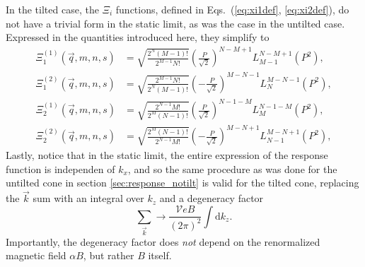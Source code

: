 In the tilted case, the \( \Xi_{i} \) functions, defined in Eqs.~(\ref{eq:xi1def}, \ref{eq:xi2def}), do not have a trivial form in the static limit, as was the case in the untilted case.
Expressed in the quantities introduced here, they simplify to
\begin{subequations}
  \begin{align}
    \Xi_1 ^{(1)}(\vec{q}, m, n, s) &= \sqrt{\frac{2^N (M-1)!}{2^{M-1} N!}}
                                     \left( \frac{P}{\sqrt{2}} \right)^{N-M + 1}
                                     L^{N-M+1}_{M-1} \left( P^2 \right),\\
    \Xi_1 ^{(2)}(\vec{q}, m, n, s) &= \sqrt{\frac{2^{M-1} N!}{2^N (M-1)!}}
                                     \left( -\frac{P}{\sqrt{2}} \right)^{M-N - 1}
                                     L^{M - N - 1}_N \left( P^2 \right),
  \end{align}
\end{subequations}
\begin{subequations}
  \begin{align}
    \Xi_2 ^{(1)}(\vec{q}, m, n, s) &= \sqrt{\frac{2^{N-1} M!}{2^M (N-1)!}}
                                     \left( \frac{P}{\sqrt{2}} \right)^{N-1 - M}
                                     L^{N-1 -M}_{M} \left( P^2 \right),\\
    \Xi_2 ^{(2)}(\vec{q}, m, n, s) &= \sqrt{\frac{2^M (N-1)!}{2^{N-1} M!}}
                                     \left( -\frac{P}{\sqrt{2}} \right)^{M-N + 1}
                                     L^{M - N + 1}_{N-1} \left( P^2 \right),
  \end{align}
\end{subequations}
Lastly, notice that in the static limit, the entire expression of the response function is independen of \( k_x \), and so the same procedure as was done for the untilted cone in section \ref{sec:response_notilt} is valid for the tilted cone, replacing the \( \vec{k} \) sum with an integral over \( k_z \) and a degeneracy factor
\begin{equation}
  \label{eq:113}
  \sum\limits_{\vec{k}}^{} \to \frac{\mathcal{V} e B}{(2\pi)^2 } \int \mathrm{d} k_z.
\end{equation}
Importantly, the degeneracy factor does \emph{not} depend on the renormalized magnetic field \( \alpha B \), but rather \( B \) itself.

